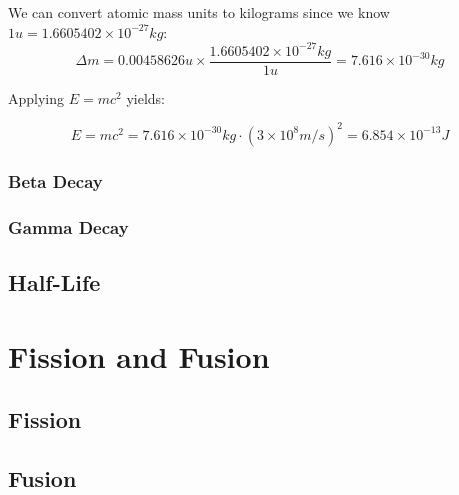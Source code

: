 \begin{mdframed}[backgroundcolor=blue!10!white]
We can convert atomic mass units to kilograms since we know $1 \si{u} = 1.6605402 \times 10^{-27} \si{kg}$:
\begin{equation*}
\Delta m =  0.00458626 \si{u} \times \frac{1.6605402 \times 10^{-27} \si{kg}}{1\si{u}} = 7.616 \times 10^{-30} \si{kg}
\end{equation*}

Applying $E = mc^2$ yields:

\begin{equation}
E = m c ^2 = 7.616 \times 10^{-30} \si{kg} \cdot (3 \times 10^8 \si{m/s})^2  = \boxed{6.854\times 10^{-13} \si{J}}
\end{equation}
	
\end{mdframed}




\subsubsection{Beta Decay}
\subsubsection{Gamma Decay}
\subsection{Half-Life}


\section{Fission and Fusion}
\subsection{Fission}
\subsection{Fusion}



	


